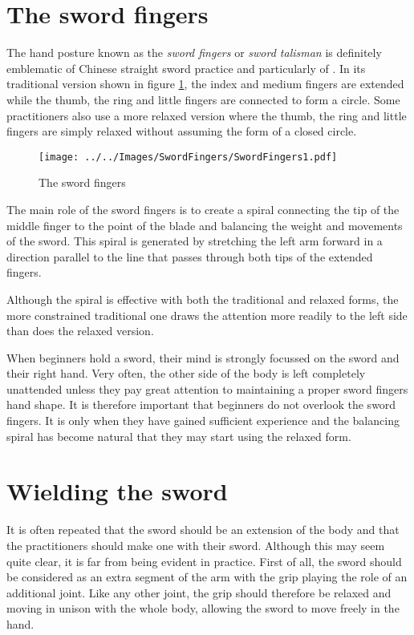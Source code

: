 \section{The sword fingers}
The hand posture known as the \emph{sword fingers} or \emph{sword talisman} is definitely emblematic of Chinese straight sword practice and particularly of \Taijijian{}.
In its traditional version shown in figure \ref{fig:swordfingers}, the index and medium fingers are extended while the thumb, the ring and little fingers are connected to form a circle.
Some practitioners also use a more relaxed version where the thumb, the ring and little fingers are simply relaxed without assuming the form of a closed circle.

\begin{figure}[ht]
	\centering
	\texttt{[image: ../../Images/SwordFingers/SwordFingers1.pdf]}
	\caption[The sword fingers]{The sword fingers}
	\label{fig:swordfingers}
\end{figure}

The main role of the sword fingers is to create a spiral connecting the tip of the middle finger to the point of the blade and balancing the weight and movements of the sword.
This spiral is generated by stretching the left arm forward in a direction parallel to the line that passes through both tips of the extended fingers.

Although the spiral is effective with both the traditional and relaxed forms, the more constrained traditional one draws the attention more readily to the left side than does the relaxed version.

When beginners hold a sword, their mind is strongly focussed on the sword and their right hand. Very often, the other side of the body is left completely unattended unless they pay great attention to maintaining a proper sword fingers hand shape.
It is therefore important that beginners do not overlook the sword fingers.
It is only when they have gained sufficient experience and the balancing spiral has become natural that they may start using the relaxed form.

\section{Wielding the sword}
It is often repeated that the sword should be an extension of the body and that the practitioners should make one with their sword.
Although this may seem quite clear, it is far from being evident in practice.
First of all, the sword should be considered as an extra segment of the arm with the grip playing the role of an additional joint.
Like any other joint, the grip should therefore be relaxed and moving in unison with the whole body, allowing the sword to move freely in the hand.

